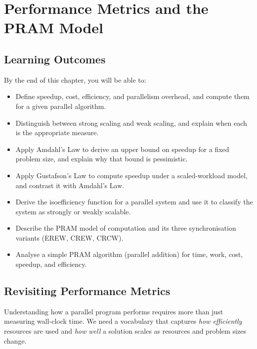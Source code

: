\chapter{Performance Metrics and the PRAM Model}

\section*{Learning Outcomes}
By the end of this chapter, you will be able to:
\begin{itemize}
  \item Define speedup, cost, efficiency, and parallelism overhead, and
        compute them for a given parallel algorithm.
  \item Distinguish between strong scaling and weak scaling, and explain
        when each is the appropriate measure.
  \item Apply Amdahl's Law to derive an upper bound on speedup for a fixed
        problem size, and explain why that bound is pessimistic.
  \item Apply Gustafson's Law to compute speedup under a scaled-workload
        model, and contrast it with Amdahl's Law.
  \item Derive the isoefficiency function for a parallel system and use it
        to classify the system as strongly or weakly scalable.
  \item Describe the PRAM model of computation and its three synchronisation
        variants (EREW, CREW, CRCW).
  \item Analyse a simple PRAM algorithm (parallel addition) for time, work,
        cost, speedup, and efficiency.
\end{itemize}

\section{Revisiting Performance Metrics}

Understanding how a parallel program performs requires more than just measuring
wall-clock time. We need a vocabulary that captures \emph{how efficiently}
resources are used and \emph{how well} a solution scales as resources and
problem sizes change.

